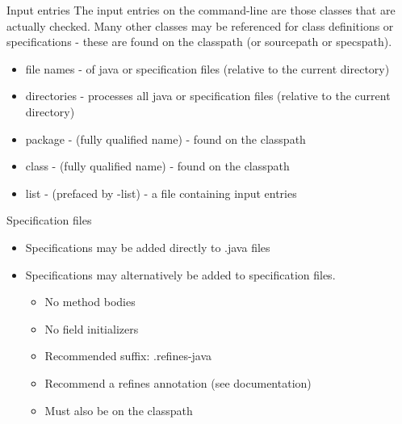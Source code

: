 \documentclass[
pdf,
nocolorBG,
slideColor,
cok,
]{prosper}
\begin{document}

\begin{slide}{Input entries}
\vspace*{-6ex}
The input entries on the command-line are those classes that are actually checked.
Many other classes may be referenced for class definitions or specifications - these are found on the classpath (or sourcepath or specspath).

\begin{itemize}
\item {\knalblue file names} - of java or specification files (relative to the current directory)
\item {\knalblue directories} - processes all java or specification files (relative to the current directory)
\item {\knalblue package} - (fully qualified name) - found on the classpath
\item {\knalblue class} - (fully qualified name) - found on the classpath
\item {\knalblue list} - (prefaced by {\green -list}) - a file containing input entries
\end{itemize}
\end{slide}


\begin{slide}{Specification files}
\vspace*{-6ex}
\begin{itemize}
\item Specifications may be added directly to .java files
\item Specifications may alternatively be added to specification files.
\begin{itemize}
\item No method bodies
\item No field initializers
\item Recommended suffix: {\blue .refines-java}
\item Recommend a {\blue refines} annotation (see documentation)
\item Must also be on the classpath
\end{itemize}
\end{itemize}
\end{slide}

\end{document}
